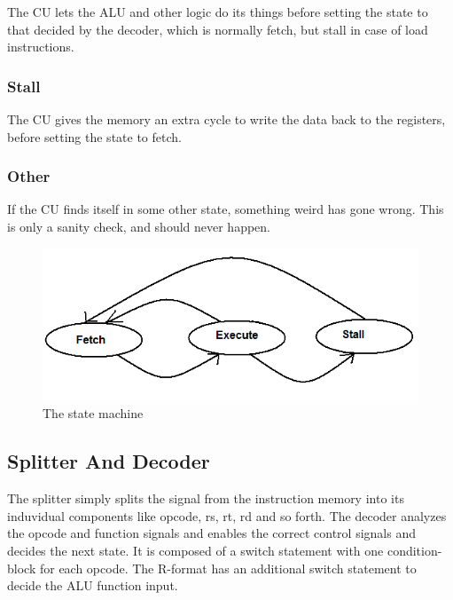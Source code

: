 The CU lets the ALU and other logic do its things before setting the state to
that decided by the decoder, which is normally fetch, but stall in case of load
instructions.

\subsubsection{Stall}

The CU gives the memory an extra cycle to write the data back to the registers,
before setting the state to fetch.

\subsubsection{Other}

If the CU finds itself in some other state, something weird has gone wrong.
This is only a sanity check, and should never happen.

\begin{figure}[ht] \centering
\includegraphics[scale=0.5]{figures/controlunitstatemachine.png}
\caption{\label{fig:stateMachine}The state machine} \end{figure}

\subsection{Splitter And Decoder}

The splitter simply splits the signal from the instruction memory into its
induvidual components like opcode, rs, rt, rd and so forth.  The decoder
analyzes the opcode and function signals and enables the correct control signals
and decides the next state.  It is composed of a switch statement with one
condition-block for each opcode.  The R-format has an additional switch
statement to decide the ALU function input.

